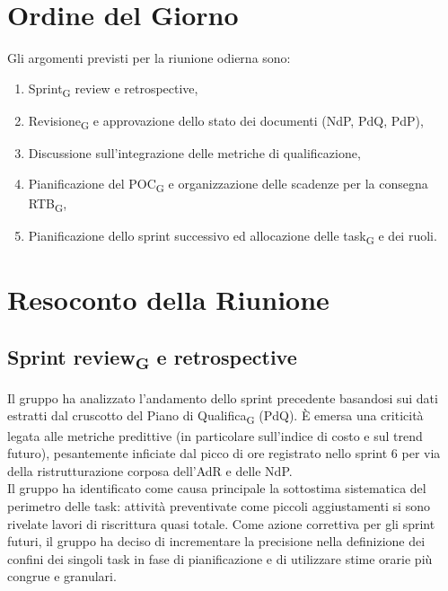 \section{Ordine del Giorno}
Gli argomenti previsti per la riunione odierna sono:
\begin{enumerate}
	\item Sprint\textsubscript{G} review e retrospective,
	\item Revisione\textsubscript{G} e approvazione dello stato dei documenti (NdP, PdQ, PdP),
	\item Discussione sull'integrazione delle metriche di qualificazione,
	\item Pianificazione del POC\textsubscript{G} e organizzazione delle scadenze per la consegna RTB\textsubscript{G},
	\item Pianificazione dello sprint successivo ed allocazione delle task\textsubscript{G} e dei ruoli.
\end{enumerate}

\section{Resoconto della Riunione}

\subsection{Sprint review\textsubscript{G} e retrospective}
Il gruppo ha analizzato l'andamento dello sprint precedente basandosi sui dati estratti dal cruscotto del Piano di Qualifica\textsubscript{G} (PdQ). È emersa una criticità legata alle metriche predittive (in particolare sull'indice di costo e sul trend futuro), pesantemente inficiate dal picco di ore registrato nello sprint 6 per via della ristrutturazione corposa dell'AdR e delle NdP. \\
Il gruppo ha identificato come causa principale la sottostima sistematica del perimetro delle task: attività preventivate come piccoli aggiustamenti si sono rivelate lavori di riscrittura quasi totale. Come azione correttiva per gli sprint futuri, il gruppo ha deciso di incrementare la precisione nella definizione dei confini dei singoli task in fase di pianificazione e di utilizzare stime orarie più congrue e granulari.

